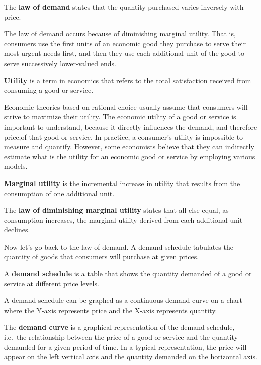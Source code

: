 The \textbf{law of demand} states that the quantity purchased varies inversely with price.
\ed

The law of demand occurs because of diminishing marginal utility. That is, consumers use the first units of an
economic good they purchase to serve their most urgent needs first, and then they use each additional unit of the
good to serve successively lower-valued ends.

\bd[Utility]
\textbf{Utility} is a term in economics that refers to the total satisfaction received from consuming a good or service.
\ed

Economic theories based on rational choice usually assume that consumers will strive to maximize their utility. The
economic utility of a good or service is important to understand, because it directly influences the demand, and
therefore price,of that good or service. In practice, a consumer's utility is impossible to measure and quantify.
However, some economists believe that they can indirectly estimate what is the utility for an economic good or
service by employing various models.

\textbf{Marginal utility} is the incremental increase in utility that results from the consumption of one additional
unit.
\ed

The \textbf{law of diminishing marginal utility} states that all else equal, as consumption increases, the marginal
utility derived from each additional unit declines.
\ed

Now let's go back to the law of demand. A demand schedule tabulates the quantity of goods that consumers will
purchase at given prices.

A \textbf{demand schedule} is a table that shows the quantity demanded of a good or service at different price levels.
\ed

A demand schedule can be graphed as a continuous demand curve on a chart where the Y-axis represents price and the
X-axis represents quantity.

The \textbf{demand curve} is a graphical representation of the demand schedule, i.e.\ the relationship between the
price of a good or service and the quantity demanded for a given period of time. In a typical representation, the
price will appear on the left vertical axis and the quantity demanded on the horizontal axis.
\ed

\be
{}

